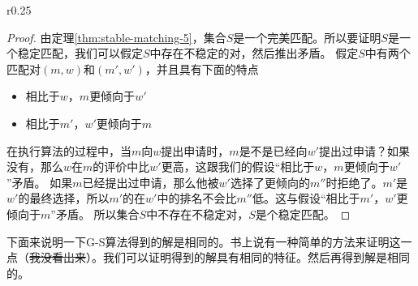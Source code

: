 \begin{wrapfigure}[6]{r}{0.25\linewidth}
	\centering
	\caption{}\label{fig:stable-matching-2}
\end{wrapfigure}
\begin{proof}
	由定理\ref{thm:stable-matching-5}，集合$S$是一个完美匹配。所以要证明$S$是一个稳定匹配，我们可以假定$S$中存在不稳定的对，然后推出矛盾。
	假定$S$中有两个匹配对$(m,w)$和$(m',w')$，并且具有下面的特点
	\begin{itemize}[label=$\ast$]
		\item 相比于$w$，$m$更倾向于$w'$
		\item 相比于$m'$，$w'$更倾向于$m$
	\end{itemize}
	在执行算法的过程中，当$m$向$w$提出申请时，$m$是不是已经向$w'$提出过申请？如果没有，那么$w$在$m$的评价中比$w'$更高，这跟我们的假设“相比于$w$，$m$更倾向于$w'$”矛盾。
	如果$m$已经提出过申请，那么他被$w'$选择了更倾向的$m''$时拒绝了。$m'$是$w'$的最终选择，所以$m'$的在$w'$中的排名不会比$m''$低。这与假设“相比于$m'$，$w'$更倾向于$m$”矛盾。
	所以集合$S$中不存在不稳定对，$S$是个稳定匹配。
\end{proof}
下面来说明一下G-S算法得到的解是相同的。书上说有一种简单的方法来证明这一点（\sout{我没看出来}）。我们可以证明得到的解具有相同的特征。然后再得到解是相同的。


